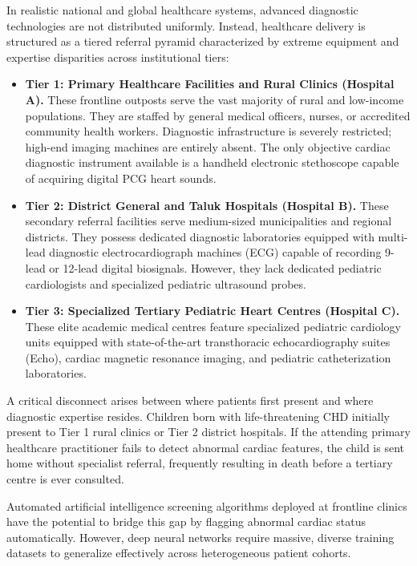 \documentclass[12pt,a4paper]{amritareport}
\begin{document}
In realistic national and global healthcare systems, advanced diagnostic technologies are not distributed uniformly. Instead, healthcare delivery is structured as a tiered referral pyramid characterized by extreme equipment and expertise disparities across institutional tiers:
\begin{itemize}
	\item \textbf{Tier 1: Primary Healthcare Facilities and Rural Clinics (Hospital A).} These frontline outposts serve the vast majority of rural and low-income populations. They are staffed by general medical officers, nurses, or accredited community health workers. Diagnostic infrastructure is severely restricted; high-end imaging machines are entirely absent. The only objective cardiac diagnostic instrument available is a handheld electronic stethoscope capable of acquiring digital PCG heart sounds.
	\item \textbf{Tier 2: District General and Taluk Hospitals (Hospital B).} These secondary referral facilities serve medium-sized municipalities and regional districts. They possess dedicated diagnostic laboratories equipped with multi-lead diagnostic electrocardiograph machines (ECG) capable of recording 9-lead or 12-lead digital biosignals. However, they lack dedicated pediatric cardiologists and specialized pediatric ultrasound probes.
	\item \textbf{Tier 3: Specialized Tertiary Pediatric Heart Centres (Hospital C).} These elite academic medical centres feature specialized pediatric cardiology units equipped with state-of-the-art transthoracic echocardiography suites (Echo), cardiac magnetic resonance imaging, and pediatric catheterization laboratories.
\end{itemize}

A critical disconnect arises between where patients first present and where diagnostic expertise resides. Children born with life-threatening CHD initially present to Tier 1 rural clinics or Tier 2 district hospitals. If the attending primary healthcare practitioner fails to detect abnormal cardiac features, the child is sent home without specialist referral, frequently resulting in death before a tertiary centre is ever consulted. 

Automated artificial intelligence screening algorithms deployed at frontline clinics have the potential to bridge this gap by flagging abnormal cardiac status automatically. However, deep neural networks require massive, diverse training datasets to generalize effectively across heterogeneous patient cohorts.
\end{document}
